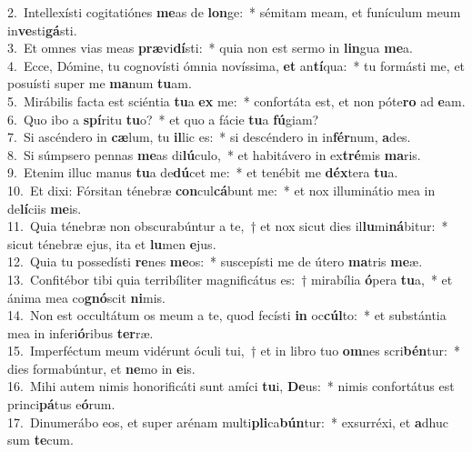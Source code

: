 {2.~}Intellexísti cogitatiónes \textbf{me}as de \textbf{lon}ge:~* sémitam meam, et funículum meum in\textbf{ve}sti\textbf{gá}sti.\\
{3.~}Et omnes vias meas \textbf{præ}vi\textbf{dí}sti:~* quia non est sermo in \textbf{lin}gua \textbf{me}a.\\
{4.~}Ecce, Dómine, tu cognovísti ómnia novíssima, \textbf{et} an\textbf{tí}qua:~* tu formásti me, et posuísti super me \textbf{ma}num \textbf{tu}am.\\
{5.~}Mirábilis facta est sciéntia \textbf{tu}a \textbf{ex} me:~* confortáta est, et non póte\textbf{ro} ad \textbf{e}am.\\
{6.~}Quo ibo a \textbf{spí}ritu \textbf{tu}o?~* et quo a fácie \textbf{tu}a \textbf{fú}giam?\\
{7.~}Si ascéndero in \textbf{cæ}lum, tu \textbf{il}lic es:~* si descéndero in in\textbf{fér}num, \textbf{a}des.\\
{8.~}Si súmpsero pennas \textbf{me}as di\textbf{lú}culo,~* et habitávero in ex\textbf{tré}mis \textbf{ma}ris.\\
{9.~}Etenim illuc manus \textbf{tu}a de\textbf{dú}cet me:~* et tenébit me \textbf{déx}tera \textbf{tu}a.\\
{10.~}Et dixi: Fórsitan ténebræ \textbf{con}cul\textbf{cá}bunt me:~* et nox illuminátio mea in de\textbf{lí}ciis \textbf{me}is.\\
{11.~}Quia ténebræ non obscurabúntur a te,~† et nox sicut dies il\textbf{lu}mi\textbf{ná}bitur:~* sicut ténebræ ejus, ita et \textbf{lu}men \textbf{e}jus.\\
{12.~}Quia tu possedísti \textbf{re}nes \textbf{me}os:~* suscepísti me de útero \textbf{ma}tris \textbf{me}æ.\\
{13.~}Confitébor tibi quia terribíliter magnificátus es:~† mirabília \textbf{ó}pera \textbf{tu}a,~* et ánima mea co\textbf{gnó}scit \textbf{ni}mis.\\
{14.~}Non est occultátum os meum a te, quod fecísti \textbf{in} oc\textbf{cúl}to:~* et substántia mea in inferi\textbf{ó}ribus \textbf{ter}ræ.\\
{15.~}Imperféctum meum vidérunt óculi tui,~† et in libro tuo \textbf{om}nes scri\textbf{bén}tur:~* dies formabúntur, et \textbf{ne}mo in \textbf{e}is.\\
{16.~}Mihi autem nimis honorificáti sunt amíci \textbf{tu}i, \textbf{De}us:~* nimis confortátus est princi\textbf{pá}tus e\textbf{ó}rum.\\
{17.~}Dinumerábo eos, et super arénam multi\textbf{pli}ca\textbf{bún}tur:~* exsurréxi, et \textbf{a}dhuc sum \textbf{te}cum.\\
